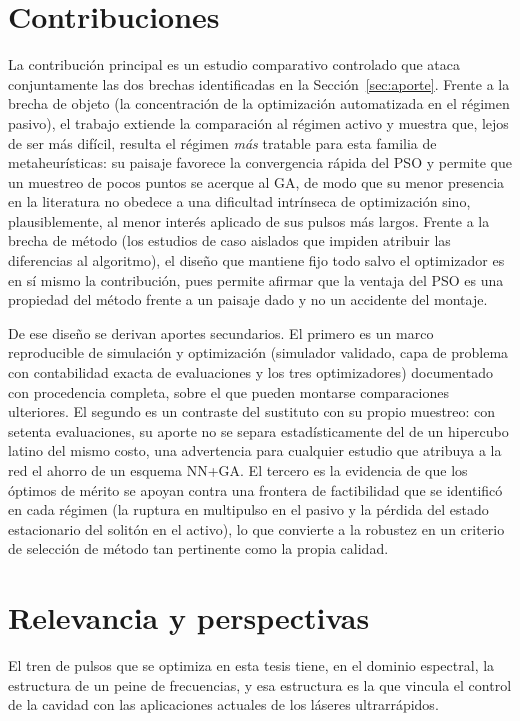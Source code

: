 \section{Contribuciones}
\label{sec:conc_contribuciones}

La contribución principal es un estudio comparativo controlado que ataca conjuntamente las
dos brechas identificadas en la Sección~\ref{sec:aporte}. Frente a la brecha de objeto (la
concentración de la optimización automatizada en el régimen pasivo), el trabajo extiende la
comparación al régimen activo y muestra que, lejos de ser más difícil, resulta el régimen
\emph{más} tratable para esta familia de metaheurísticas: su paisaje favorece la convergencia
rápida del PSO y permite que un muestreo de pocos puntos se acerque al GA, de modo que su menor presencia
en la literatura no obedece a una dificultad intrínseca de optimización sino, plausiblemente,
al menor interés aplicado de sus pulsos más largos. Frente a la brecha de método (los
estudios de caso aislados que impiden atribuir las diferencias al algoritmo), el diseño que
mantiene fijo todo salvo el optimizador es en sí mismo la contribución, pues permite afirmar
que la ventaja del PSO es una propiedad del método frente a un paisaje dado y no un
accidente del montaje.

De ese diseño se derivan aportes secundarios. El primero es un marco reproducible de
simulación y optimización (simulador validado, capa de problema con contabilidad exacta de
evaluaciones y los tres optimizadores) documentado con procedencia completa, sobre el que
pueden montarse comparaciones ulteriores. El segundo es un contraste del sustituto con su propio muestreo:
con setenta evaluaciones, su aporte no se separa estadísticamente del de un hipercubo
latino del mismo costo, una advertencia para cualquier estudio que atribuya a la red el
ahorro de un esquema NN+GA. El tercero es la evidencia de que los óptimos de mérito se
apoyan contra una frontera de factibilidad que se identificó en cada régimen (la ruptura
en multipulso en el pasivo y la pérdida del estado estacionario del solitón en el
activo), lo que convierte a la robustez en un criterio de selección de método tan
pertinente como la propia calidad.

\section{Relevancia y perspectivas}
\label{sec:conc_relevancia}

El tren de pulsos que se optimiza en esta tesis tiene, en el dominio espectral, la
estructura de un peine de frecuencias, y esa estructura es la que vincula el control de
la cavidad con las aplicaciones actuales de los láseres ultrarrápidos.

